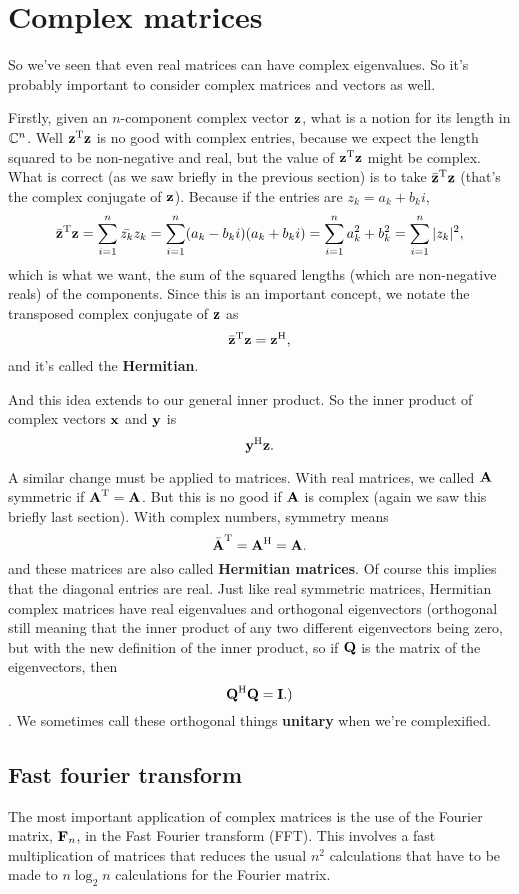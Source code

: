 \section{Complex matrices}

So we've seen that even real matrices can have complex eigenvalues. So it's probably important to consider complex matrices and vectors as well. 

Firstly, given an $n$-component complex vector $\boldsymbol{\mathbf{z}}$, what is a notion for its length in $\mathbb{C}^n$. Well $\boldsymbol{\mathbf{z}}^\mathrm{T}\boldsymbol{\mathbf{z}}$ is no good with complex entries, because we expect the length squared to be non-negative and real, but the value of $\boldsymbol{\mathbf{z}}^\mathrm{T}\boldsymbol{\mathbf{z}}$ might be complex. What is correct (as we saw briefly in the previous section) is to take $\bar{\boldsymbol{\mathbf{z}}}^\mathrm{T}\boldsymbol{\mathbf{z}}$ (that's the complex conjugate of $\boldsymbol{\mathbf{z}}$). Because if the entries are $z_k = a_k+b_ki$,
\[ \bar{\boldsymbol{\mathbf{z}}}^\mathrm{T}\boldsymbol{\mathbf{z}} = \sum_{i=1}^n\bar{z_k}z_k = \sum_{i=1}^n(a_k-b_ki)(a_k+b_ki) = \sum_{i=1}^n a_k^2 + b_k^2 = \sum_{i=1}^n|z_k|^2, \]
which is what we want, the sum of the squared lengths (which are non-negative reals) of the components. Since this is an important concept, we notate the transposed complex conjugate of $\boldsymbol{\mathbf{z}}$ as 
\[ \bar{\boldsymbol{\mathbf{z}}}^\mathrm{T}\boldsymbol{\mathbf{z}} = \boldsymbol{\mathbf{z}}^\mathrm{H}, \]
and it's called the \textbf{Hermitian}.

And this idea extends to our general inner product. So the inner product of complex vectors $\boldsymbol{\mathbf{x}}$ and $\boldsymbol{\mathbf{y}}$ is 
\[ \boldsymbol{\mathbf{y}}^\mathrm{H}\boldsymbol{\mathbf{z}}. \]

A similar change must be applied to matrices. With real matrices, we called $\boldsymbol{\mathbf{A}}$ symmetric if $\boldsymbol{\mathbf{A}}^\mathrm{T} = \boldsymbol{\mathbf{A}}$. But this is no good if $\boldsymbol{\mathbf{A}}$ is complex (again we saw this briefly last section). With complex numbers, symmetry means
\[ \bar{\boldsymbol{\mathbf{A}}}^\mathrm{T} = \boldsymbol{\mathbf{A}}^\mathrm{H} = \boldsymbol{\mathbf{A}}. \]
and these matrices are also called \textbf{Hermitian matrices}. Of course this implies that the diagonal entries are real. Just like real symmetric matrices, Hermitian complex matrices have real eigenvalues and orthogonal eigenvectors (orthogonal still meaning that the inner product of any two different eigenvectors being zero, but with the new definition of the inner product, so if $\boldsymbol{\mathbf{Q}}$ is the matrix of the eigenvectors, then
\[ \boldsymbol{\mathbf{Q}}^\mathrm{H}\boldsymbol{\mathbf{Q}} = \boldsymbol{\mathbf{I}}.) \]. 
We sometimes call these orthogonal things \textbf{unitary} when we're complexified.

\subsection{Fast fourier transform}

The most important application of complex matrices is the use of the Fourier matrix, $\boldsymbol{\mathbf{F}}_n$, in the Fast Fourier transform (FFT). This involves a fast multiplication of matrices that reduces the usual $n^2$ calculations that have to be made to $n \log_2 n$ calculations for the Fourier matrix. 

